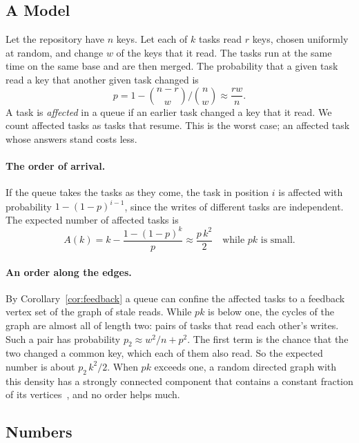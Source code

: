 \documentclass[acmsmall,nonacm,screen]{acmart}
\begin{document}
\subsection{A Model}

Let the repository have $n$ keys. Let each of $k$ tasks read $r$ keys, chosen uniformly at
random, and change $w$ of the keys that it read. The tasks run at the same time on the same
base and are then merged. The probability that a given task read a key that another given
task changed is
\[
p = 1 - \binom{n - r}{w} \Big/ \binom{n}{w} \approx \frac{r w}{n}.
\]
A task is \emph{affected} in a queue if an earlier task changed a key that it read. We count
affected tasks as tasks that resume. This is the worst case; an affected task whose
answers stand costs less.

\paragraph{The order of arrival.} If the queue takes the tasks as they come, the task in
position $i$ is affected with probability $1 - (1 - p)^{i - 1}$, since the writes of
different tasks are independent. The expected number of affected tasks is
\[
A(k) = k - \frac{1 - (1 - p)^k}{p} \approx \frac{p\,k^2}{2} \quad \text{while $p k$ is small.}
\]

\paragraph{An order along the edges.} By Corollary~\ref{cor:feedback} a queue can confine
the affected tasks to a feedback vertex set of the graph of stale reads. While $p k$ is
below one, the cycles of the graph are almost all of length two: pairs of tasks that read
each other's writes. Such a pair has probability $p_2 \approx w^2 / n + p^2$. The first term
is the chance that the two changed a common key, which each of them also read. So the
expected number is about $p_2\,k^2 / 2$. When $p k$ exceeds one, a random directed graph
with this density has a strongly connected component that contains a constant fraction of
its vertices~\citep{karp1990}, and no order helps much.

\subsection{Numbers}
\end{document}
